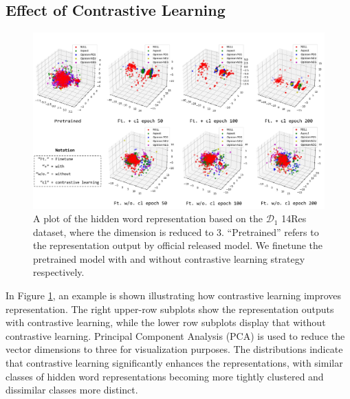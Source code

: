 \documentclass[11pt]{article}
\begin{document}
\subsection{Effect of Contrastive Learning}
\begin{figure}[ht]
    \centering
    \includegraphics[width=\linewidth]{fig_contr_plot.pdf}
    \caption{A plot of the hidden word representation based on the $\mathcal{D}_1$ 14Res dataset, where the dimension is reduced to 3. ``Pretrained'' refers to the representation output by official released model. We finetune the pretrained model with and without contrastive learning strategy respectively. }
    \label{fig:fig_contr_plot.pdf}
\end{figure}

In Figure \ref{fig:fig_contr_plot.pdf}, an example is shown illustrating how contrastive learning improves representation. The right upper-row subplots show the representation outputs with contrastive learning, while the lower row subplots display that without contrastive learning. Principal Component Analysis (PCA) \citep{mackiewicz1993principal} is used to reduce the vector dimensions to three for visualization purposes. The distributions indicate that contrastive learning significantly enhances the representations, with similar classes of hidden word representations becoming more tightly clustered and dissimilar classes more distinct.

\end{document}
